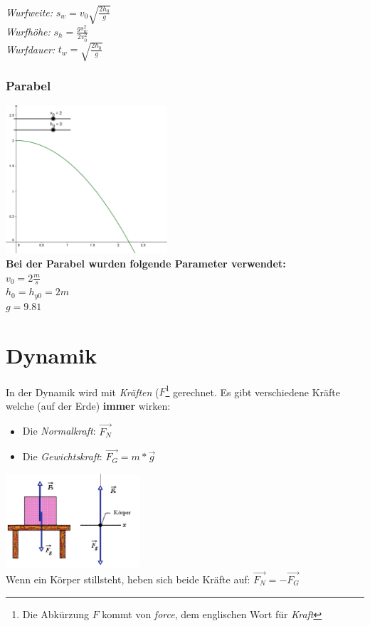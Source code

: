 \documentclass[10pt,a4paper,twoside]{article}
\begin{document}
	\begin{multicols}{2}
		\textit{Wurfweite:} \(s_w = v_0 \sqrt{ \frac{2h_0}{g} } \)\\
		\textit{Wurfhöhe:}  \(s_h = \frac{gs_w^2}{2v_0^2}\)\\
		\textit{Wurfdauer:} \(t_w = \sqrt{ \frac{2h_0}{g} }\)
	\end{multicols}
	
	\subsubsection{Parabel}
	
	\begin{multicols}{2}
		\includegraphics[width=6cm]{img/wurf_example}\\
		
		\textbf{Bei der Parabel wurden folgende Parameter verwendet:}\\
		\(v_0 = 2\frac{m}{s}\)\\
		\(h_0 = h_{y0} = 2m\)\\
		\(g = 9.81\)
	\end{multicols}
	\section{Dynamik}
	
	In der Dynamik wird mit \textit{Kräften} (\(F\)\footnote{Die Abkürzung \(F\) kommt von \textit{force}, dem englischen Wort für \textit{Kraft}} gerechnet. Es gibt verschiedene Kräfte welche (auf der Erde) \textbf{immer} wirken:
	
	\begin{itemize}
		\item Die \textit{Normalkraft}: \(\vec{F_N}\)
		\item Die \textit{Gewichtskraft}: \(\vec{F_G} = m * \vec{g}\)
	\end{itemize}
	
	
	\includegraphics[width=5cm]{img/force_example}\\
	Wenn ein Körper stillsteht, heben sich beide Kräfte auf: \( \vec{F_N} = - \vec{F_G}\)
	
\end{document}
